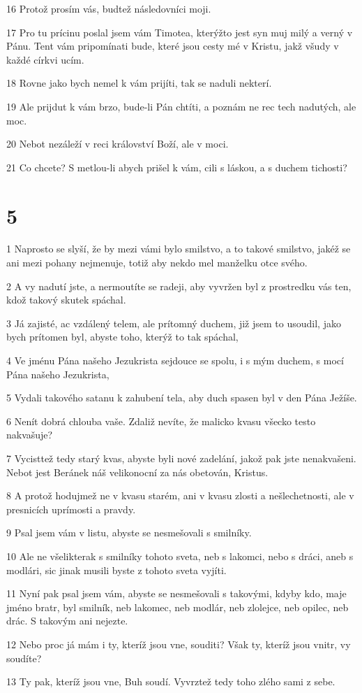 \par 16 Protož prosím vás, budtež následovníci moji.
\par 17 Pro tu prícinu poslal jsem vám Timotea, kterýžto jest syn muj milý a verný v Pánu. Tent vám pripomínati bude, které jsou cesty mé v Kristu, jakž všudy v každé církvi ucím.
\par 18 Rovne jako bych nemel k vám prijíti, tak se naduli nekterí.
\par 19 Ale prijdut k vám brzo, bude-li Pán chtíti, a poznám ne rec tech nadutých, ale moc.
\par 20 Nebot nezáleží v reci království Boží, ale v moci.
\par 21 Co chcete? S metlou-li abych prišel k vám, cili s láskou, a s duchem tichosti?

\chapter{5}

\par 1 Naprosto se slyší, že by mezi vámi bylo smilstvo, a to takové smilstvo, jakéž se ani mezi pohany nejmenuje, totiž aby nekdo mel manželku otce svého.
\par 2 A vy nadutí jste, a nermoutíte se radeji, aby vyvržen byl z prostredku vás ten, kdož takový skutek spáchal.
\par 3 Já zajisté, ac vzdálený telem, ale prítomný duchem, již jsem to usoudil, jako bych prítomen byl, abyste toho, kterýž to tak spáchal,
\par 4 Ve jménu Pána našeho Jezukrista sejdouce se spolu, i s mým duchem, s mocí Pána našeho Jezukrista,
\par 5 Vydali takového satanu k zahubení tela, aby duch spasen byl v den Pána Ježíše.
\par 6 Nenít dobrá chlouba vaše. Zdaliž nevíte, že malicko kvasu všecko testo nakvašuje?
\par 7 Vycisttež tedy starý kvas, abyste byli nové zadelání, jakož pak jste nenakvašeni. Nebot jest Beránek náš velikonocní za nás obetován, Kristus.
\par 8 A protož hodujmež ne v kvasu starém, ani v kvasu zlosti a nešlechetnosti, ale v presnicích uprímosti a pravdy.
\par 9 Psal jsem vám v listu, abyste se nesmešovali s smilníky.
\par 10 Ale ne všelikterak s smilníky tohoto sveta, neb s lakomci, nebo s dráci, aneb s modlári, sic jinak musili byste z tohoto sveta vyjíti.
\par 11 Nyní pak psal jsem vám, abyste se nesmešovali s takovými, kdyby kdo, maje jméno bratr, byl smilník, neb lakomec, neb modlár, neb zlolejce, neb opilec, neb drác. S takovým ani nejezte.
\par 12 Nebo proc já mám i ty, kteríž jsou vne, souditi? Však ty, kteríž jsou vnitr, vy soudíte?
\par 13 Ty pak, kteríž jsou vne, Buh soudí. Vyvrztež tedy toho zlého sami z sebe.

